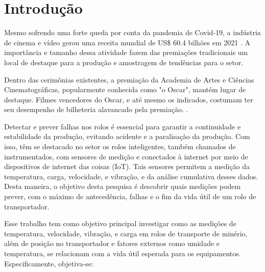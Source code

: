 
\chapter[Introdução]{Introdução}
Mesmo sofrendo uma forte queda por conta da pandemia de Covid-19, a indústria de cinema e vídeo gerou uma receita mundial de US\$ 60.4 bilhões em 2021 \cite{indiantelevision2021}. A importância e tamanho dessa atividade fazem das premiações tradicionais um local de destaque para a produção e amostragem de tendências para o setor.\par
Dentro das cerimônias existentes, a premiação da Academia de Artes e Ciências Cinematográficas, popularmente conhecida como "o Oscar", mantém lugar de destaque. Filmes vencedores do Oscar, e até mesmo os indicados, costumam ter seu desempenho de bilheteria alavancado pela premiação. \cite{hdsr2020}.

Detectar e prever falhas nos rolos é essencial para garantir a continuidade e estabilidade da produção, evitando acidente e a paralisação da produção. Com isso, têm se destacado no setor os rolos inteligentes, também chamados de instrumentados, com sensores de medição e conectados à internet por meio de dispositivos de internet das coisas (IoT). Tais sensores permitem a medição da temperatura, carga, velocidade, e vibração, e da análise cumulativa desses dados. Desta maneira, o objetivo desta pesquisa é descobrir quais medições podem prever, com o máximo de antecedência, falhas e o fim da vida útil de um rolo de transportador.\par

Esse trabalho tem como objetivo principal investigar como as medições de temperatura, velocidade, vibração, e carga em rolos de transporte de minério, além de posição no transportador e fatores externos como umidade e temperatura, se relacionam com a vida útil esperada para os equipamentos. Especificamente, objetiva-se:\par

